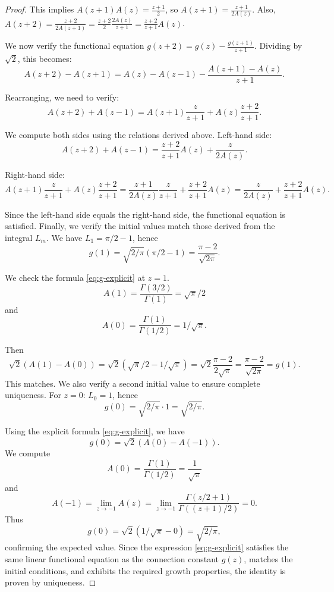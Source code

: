 \documentclass[10pt,a4paper]{amsart}
\begin{document}
\begin{proof}
This implies $A(z+1)A(z) = \frac{z+1}{2}$, so $A(z+1) = \frac{z+1}{2A(z)}$.
Also, $A(z+2) = \frac{z+2}{2A(z+1)} = \frac{z+2}{2} \frac{2A(z)}{z+1} = \frac{z+2}{z+1}A(z)$.

We now verify the functional equation $g(z+2) = g(z) - \frac{g(z+1)}{z+1}$. Dividing by $\sqrt{2}$, this becomes:
$$A(z+2)-A(z+1) = A(z)-A(z-1) - \frac{A(z+1)-A(z)}{z+1}.$$

Rearranging, we need to verify:
$$A(z+2)+A(z-1) = A(z+1)\frac{z}{z+1} + A(z)\frac{z+2}{z+1}.$$

We compute both sides using the relations derived above. Left-hand side:
$$A(z+2)+A(z-1) = \frac{z+2}{z+1}A(z) + \frac{z}{2A(z)}.$$

Right-hand side:
$$A(z+1)\frac{z}{z+1} + A(z)\frac{z+2}{z+1} = \frac{z+1}{2A(z)}\frac{z}{z+1} + \frac{z+2}{z+1}A(z) = \frac{z}{2A(z)} + \frac{z+2}{z+1}A(z).$$

Since the left-hand side equals the right-hand side, the functional equation is satisfied. Finally, we verify the initial values match those derived from the integral $L_m$. We have $L_1 = \pi/2-1$, hence 
$$g(1) = \sqrt{2/\pi}(\pi/2-1) = \frac{\pi-2}{\sqrt{2\pi}}.$$

We check the formula \eqref{eq:g-explicit} at $z=1$. 
$$A(1) = \frac{\Gamma(3/2)}{\Gamma(1)} = \sqrt{\pi}/2$$ 
and 
$$A(0) = \frac{\Gamma(1)}{\Gamma(1/2)} = 1/\sqrt{\pi}.$$

Then 
$$ \sqrt{2}(A(1)-A(0)) = \sqrt{2}(\sqrt{\pi}/2 - 1/\sqrt{\pi}) = \sqrt{2}\frac{\pi-2}{2\sqrt{\pi}} = \frac{\pi-2}{\sqrt{2\pi}}=g(1).$$
This matches.  We also verify a second initial value to ensure complete uniqueness. For $z=0$: $L_0 = 1$, hence 
$$g(0) = \sqrt{2/\pi} \cdot 1 = \sqrt{2/\pi}.$$

Using the explicit formula \eqref{eq:g-explicit}, we have
$$g(0) = \sqrt{2}(A(0)-A(-1)).$$
We compute
$$A(0) = \frac{\Gamma(1)}{\Gamma(1/2)} = \frac{1}{\sqrt{\pi}}$$
and
$$A(-1) = \lim_{z \to -1} A(z) = \lim_{z \to -1} \frac{\Gamma(z/2+1)}{\Gamma((z+1)/2)} = 0.$$
Thus
$$g(0) = \sqrt{2}(1/\sqrt{\pi} - 0) = \sqrt{2/\pi},$$
confirming the expected value. Since the expression \eqref{eq:g-explicit} satisfies the same linear functional equation as the connection constant $g(z)$, matches the initial conditions, and exhibits the required growth properties, the identity is proven by uniqueness.
\end{proof}
\end{document}
